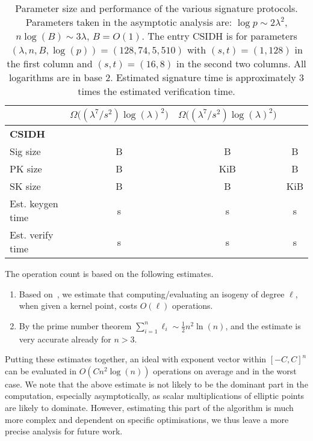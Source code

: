\documentclass{llncs}
\begin{document}
\begin{landscape}
\begin{table}
\begin{tabular}{l | c | c | c |}
      & $\Omega\bigl((\lambda^7/s^2)\log(\lambda)^2\bigr)$
      & $\Omega\bigl((\lambda^7/s^2)\log(\lambda)^2\bigr)$\\
      \hline
      \hspace{1em}\textbf{CSIDH} &&&\\
      Sig size
      & \RejSig{} B & \ParSig{} B & \ComSig{} B\\
      PK size
      & \RejPK{} B & \ParPK{} KiB & \ComPK{} B\\
      SK size
      & \RejSK{} B & \ParSK{} B & \ComSK{} KiB \\
      Est. keygen time
      & \RejKG{} s & \ParKG{} s & \ComKG{} s\\
      Est. verify time
      & \RejTime{} s & \ParTime{} s & \ComTime{} s
    \end{tabular}
    \caption{Parameter size and performance of the various signature
      protocols.
      Parameters taken in the asymptotic analysis are:
      $\log p \sim 2\lambda^2$, $n\log(B)\sim 3\lambda$, $B = O(1)$.
The entry CSIDH is for parameters $(\lambda,n,B,\log(p)) = (128, 74, 5, 510)$ with $(s,t) = (1,128)$ in the first column and $(s,t)=(16,8)$ in the second two columns.
      All logarithms are in base 2.
      Estimated signature time is approximately 3 times the estimated verification time.
    }
    \label{tab:comparison}
  \end{table}
\end{landscape}




The operation count is based on the following estimates.
\begin{enumerate}
\item Based
  on~\cite{10.1007/978-3-319-70697-9_11,10.1007/978-3-319-79063-3_11},
  we estimate that computing/evaluating an isogeny of degree $\ell$, when given a kernel point,
  costs $O(\ell)$ operations.
\item By the prime number theorem $\sum_{i=1}^n\ell_i\sim\frac{1}{2}n^2\ln(n)$, and the estimate is very accurate already for $n>3$.
\end{enumerate}
Putting these estimates together, an ideal with exponent vector within $[-C,C]^n$ can be evaluated in $O(Cn^2\log(n))$ operations on average and in the worst case. We note that the above estimate is not likely to be the dominant part in the computation, especially asymptotically,
as scalar multiplications of elliptic points are likely to dominate.
However, estimating this part of the algorithm is much more complex and dependent on specific optimisations, we thus leave a more precise analysis for future work.
\end{document}

